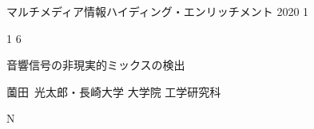 \documentclass[a4paper,uplatex,12pt]{jsarticle}
\begin{document}
\vspace*{-7.5zh}\hspace*{-5zw}
{\small マルチメディア情報ハイディング・エンリッチメント}
\hspace*{8zw}
2020
\hspace*{2zw}
1

\vspace{3zh}

\begin{minipage}[t]{0.5\textwidth}
	\hspace*{-3zw}
	\phantom{投稿締切日}
	1
	\phantom{月}\hspace{1zw}
	6
	\phantom{日}
\end{minipage}
\begin{minipage}[t]{0.5\textwidth}
	\phantom{EMM-000}
\end{minipage}	

\vspace*{6zh}
音響信号の非現実的ミックスの検出

\vspace*{7zh}
薗田~光太郎・長崎大学 大学院 工学研究科

\vspace*{2zh}
\hspace*{1.5zw}
N
\phantom{枚}
\end{document}
